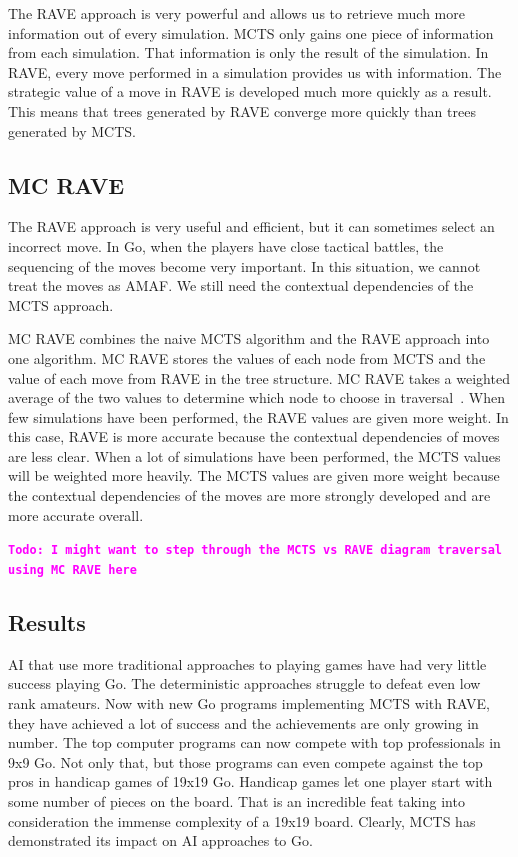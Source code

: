 \documentclass{sig-alternate}
\newcommand{\comment}[1]{{\bf \tt  {#1}}}
\newcommand{\todo}[1]{\textcolor{magenta}{\comment{Todo: {#1}}}}
\begin{document}
The RAVE approach is very powerful and allows us to retrieve much more information out of every simulation. MCTS only gains one piece of information from each simulation. That information is only the result of the simulation. In RAVE, every move performed in a simulation provides us with information. The strategic value of a move in RAVE is developed much more quickly as a result. This means that trees generated by RAVE converge more quickly than trees generated by MCTS.

\subsection{MC RAVE}
The RAVE approach is very useful and efficient, but it can sometimes select an incorrect move\cite{RAVEinGo}. In Go, when the players have close tactical battles, the sequencing of the moves become very important. In this situation, we cannot treat the moves as AMAF. We still need the contextual dependencies of the MCTS approach.

MC RAVE combines the naive MCTS algorithm and the RAVE approach into one algorithm. MC RAVE stores the values of each node from MCTS and the value of each move from RAVE in the tree structure. MC RAVE takes a weighted average of the two values to determine which node to choose in traversal~\cite{RAVEinGo}. When few simulations have been performed, the RAVE values are given more weight. In this case, RAVE is more accurate because the contextual dependencies of moves are less clear. When a lot of simulations have been performed, the MCTS values will be weighted more heavily. The MCTS values are given more weight because the contextual dependencies of the moves are more strongly developed and are more accurate overall.

\todo{I might want to step through the MCTS vs RAVE diagram traversal using MC RAVE here}

\subsection{Results}
AI that use more traditional approaches to playing games have had very little success playing Go. The deterministic approaches struggle to defeat even low rank amateurs. Now with new Go programs implementing MCTS with RAVE, they have achieved a lot of success and the achievements are only growing in number. The top computer programs can now compete with top professionals in 9x9 Go\cite{RAVEinGo}. Not only that, but those programs can even compete against the top pros in handicap games of 19x19 Go. Handicap games let one player start with some number of pieces on the board. That is an incredible feat taking into consideration the immense complexity of a 19x19 board. Clearly, MCTS has demonstrated its impact on AI approaches to Go.
\end{document}
